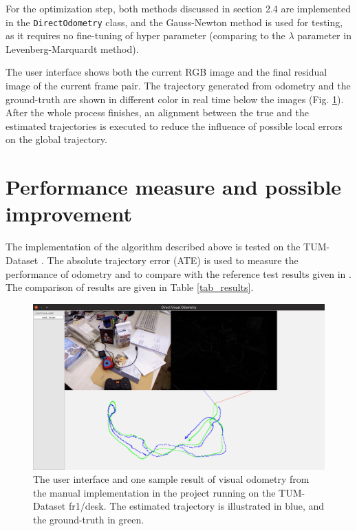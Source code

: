\documentclass[acmsmall, nonacm, 11pt]{acmart}
\begin{document}
For the optimization step, both methods discussed in section 2.4 are implemented in the \verb|DirectOdometry| class, and the Gauss-Newton method is used for testing, as it requires no fine-tuning of hyper parameter (comparing to the $\lambda$ parameter in Levenberg-Marquardt method).

The user interface shows both the current RGB image and the final residual image of the current frame pair. The trajectory generated from odometry and the ground-truth are shown in different color in real time below the images (Fig. \ref{result}). After the whole process finishes, an alignment between the true and the estimated trajectories is executed to reduce the influence of possible local errors on the global trajectory.

\section{Performance measure and possible improvement}

The implementation of the algorithm described above is tested on the TUM-Dataset \cite{sturm12iros}. The absolute trajectory error (ATE) is used to measure the performance of odometry and to compare with the reference test results given in \cite{kerl2013robust}. The comparison of results are given in Table \ref{tab_results}.

\begin{figure}[h]
    \centering
    \includegraphics[width=\textwidth]{result.png}
    \caption{The user interface and one sample result of visual odometry from the manual implementation in the project running on the TUM-Dataset fr1/desk. The estimated trajectory is illustrated in blue, and the ground-truth in green.}
    \label{result}
\end{figure}
\end{document}
